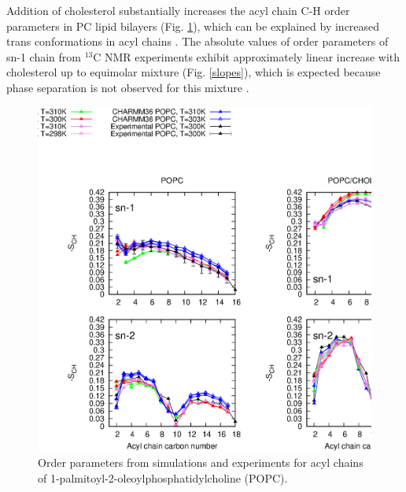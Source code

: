 \documentclass[aps,prl,superscriptaddress,twocolumn]{revtex4}
\begin{document}
Addition of cholesterol substantially increases the acyl chain C-H order parameters in PC lipid bilayers (Fig. \ref{OrderParametersCHOL}),
which can be explained by increased trans conformations in acyl chains \cite{ferreira13,??}.
The absolute values of order parameters of sn-1 chain from $^{13}$C NMR experiments \cite{ferreira13}
exhibit approximately linear increase with cholesterol up to equimolar mixture (Fig. \ref{slopes}), which is expected because
phase separation is not observed for this mixture \cite{ionova12,ferreira13}.
\begin{figure}[]
  \centering
  \includegraphics[width=17.2cm]{../FIGS/OrderParametersCHOL.eps}
  \caption{\label{OrderParametersCHOL}
    Order parameters from simulations and experiments for acyl chains of  1-palmitoyl-2-oleoylphosphatidylcholine (POPC).
  }
\end{figure}
\end{document}

